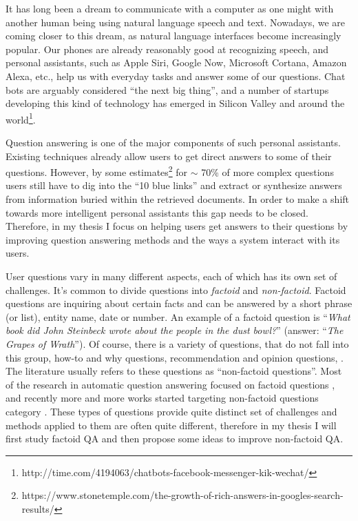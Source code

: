%
%
\label{chapter:intro}

\setcounter{page}{1}
\pagestyle{myheadings}

\noindent

It has long been a dream to communicate with a computer as one might with another human being using natural language speech and text.
Nowadays, we are coming closer to this dream, as natural language interfaces become increasingly popular.
Our phones are already reasonably good at recognizing speech, and personal assistants, such as Apple Siri, Google Now, Microsoft Cortana, Amazon Alexa, etc., help us with everyday tasks and answer some of our questions.
Chat bots are arguably considered ``the next big thing'', and a number of startups developing this kind of technology has emerged in Silicon Valley and around the world\footnote{http://time.com/4194063/chatbots-facebook-messenger-kik-wechat/}.

Question answering is one of the major components of such personal assistants.
Existing techniques already allow users to get direct answers to some of their questions.
However, by some estimates\footnote{https://www.stonetemple.com/the-growth-of-rich-answers-in-googles-search-results/} for $\sim$ 70\% of more complex questions users still have to dig into the ``10 blue links'' and extract or synthesize answers from information buried within the retrieved documents.
In order to make a shift towards more intelligent personal assistants this gap needs to be closed.
Therefore, in my thesis I focus on helping users get answers to their questions by improving question answering methods and the ways a system interact with its users.

User questions vary in many different aspects, each of which has its own set of challenges.
It's common to divide questions into \textit{factoid} and \textit{non-factoid}.
Factoid questions are inquiring about certain facts and can be answered by a short phrase (or list), \ie entity name, date or number.
An example of a factoid question is ``\textit{What book did John Steinbeck wrote about the people in the dust bowl?}'' (answer: ``\textit{The Grapes of Wrath}'').
Of course, there is a variety of questions, that do not fall into this group, \eg how-to and why questions, recommendation and opinion questions, \etc.
The literature usually refers to these questions as ``non-factoid questions''.
Most of the research in automatic question answering focused on factoid questions \cite{voorhees2001trec,lin2007exploration,BerantCFL13:sempre,Cafarella:2008:WEP:1453856.1453916}, and recently more and more works started targeting non-factoid questions category \cite{overviewliveqa15,surdeanu2011learning,fried2015higher,sharp2015spinning}.
These types of questions provide quite distinct set of challenges and methods applied to them are often quite different, therefore in my thesis I will first study factoid QA and then propose some ideas to improve non-factoid QA.

